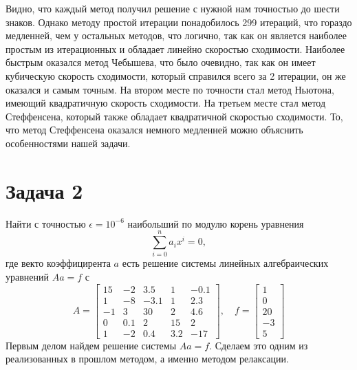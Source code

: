 \documentclass[11pt]{article}
\begin{document}
    Видно, что каждый метод получил решение с нужной нам точностью до шести
знаков. Однако методу простой итерации понадобилось 299 итераций, что
гораздо медленней, чем у остальных методов, что логично, так как он
является наиболее простым из итерационных и обладает линейно скоростью
сходимости. Наиболее быстрым оказался метод Чебышева, что было очевидно,
так как он имеет кубическую скорость сходимости, который справился всего
за 2 итерации, он же оказался и самым точным. На втором месте по
точности стал метод Ньютона, имеющий квадратичную скорость сходимости.
На третьем месте стал метод Стеффенсена, который также обладает
квадратичной скоростью сходимости. То, что метод Стеффенсена оказался
немного медленней можно объяснить особенностями нашей задачи.

    \section*{Задача 2}

Найти с точностью \({\epsilon = 10^{-6}}\) наибольший по модулю корень
уравнения
\[\sum_{i=0}^na_ix^i=0,\]
где векто коэффицирента \(a\) есть решение системы линейных
алгебраических уравнений \(Aa=f\) с
\[  A = \begin{bmatrix}
        15 & -2 & 3.5 & 1 & -0.1 \\ 
        1 & -8 & -3.1 & 1 & 2.3 \\ 
        -1 & 3 & 30 & 2 & 4.6 \\ 
        0 & 0.1 & 2 & 15 & 2 \\ 
        1 & -2 & 0.4 & 3.2 & -17 
    \end{bmatrix}, \quad
    f = \begin{bmatrix}1 \\ 0 \\ 20 \\ -3 \\ 5 \end{bmatrix} \]
    Первым делом найдем решение системы \(Aa=f\). Сделаем это одним из
реализованных в прошлом методом, а именно методом релаксации.
\end{document}
